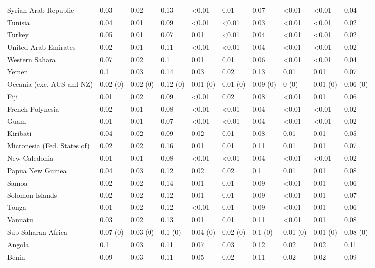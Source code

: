 \begin{longtable}[t]{llllllllll}
\addlinespace
Syrian Arab Republic & 0.03 & 0.02 & 0.13 & <0.01 & 0.01 & 0.07 & <0.01 & <0.01 & 0.04\\
Tunisia & 0.04 & 0.01 & 0.09 & <0.01 & <0.01 & 0.03 & <0.01 & <0.01 & 0.02\\
Turkey & 0.05 & 0.01 & 0.07 & 0.01 & <0.01 & 0.04 & <0.01 & <0.01 & 0.02\\
United Arab Emirates & 0.02 & 0.01 & 0.11 & <0.01 & <0.01 & 0.04 & <0.01 & <0.01 & 0.02\\
Western Sahara & 0.07 & 0.02 & 0.1 & 0.01 & 0.01 & 0.06 & <0.01 & <0.01 & 0.04\\
\addlinespace
Yemen & 0.1 & 0.03 & 0.14 & 0.03 & 0.02 & 0.13 & 0.01 & 0.01 & 0.07\\
Oceania (exc. AUS and NZ) & 0.02 (0) & 0.02 (0) & 0.12 (0) & 0.01 (0) & 0.01 (0) & 0.09 (0) & 0 (0) & 0.01 (0) & 0.06 (0)\\
Fiji & 0.01 & 0.02 & 0.09 & <0.01 & 0.02 & 0.08 & <0.01 & 0.01 & 0.06\\
French Polynesia & 0.02 & 0.01 & 0.08 & <0.01 & <0.01 & 0.04 & <0.01 & <0.01 & 0.02\\
Guam & 0.01 & 0.01 & 0.07 & <0.01 & <0.01 & 0.04 & <0.01 & <0.01 & 0.02\\
\addlinespace
Kiribati & 0.04 & 0.02 & 0.09 & 0.02 & 0.01 & 0.08 & 0.01 & 0.01 & 0.05\\
Micronesia (Fed. States of) & 0.02 & 0.02 & 0.16 & 0.01 & 0.01 & 0.11 & 0.01 & 0.01 & 0.07\\
New Caledonia & 0.01 & 0.01 & 0.08 & <0.01 & <0.01 & 0.04 & <0.01 & <0.01 & 0.02\\
Papua New Guinea & 0.04 & 0.03 & 0.12 & 0.02 & 0.02 & 0.1 & 0.01 & 0.01 & 0.08\\
Samoa & 0.02 & 0.02 & 0.14 & 0.01 & 0.01 & 0.09 & <0.01 & 0.01 & 0.06\\
\addlinespace
Solomon Islands & 0.02 & 0.02 & 0.12 & 0.01 & 0.01 & 0.09 & <0.01 & 0.01 & 0.07\\
Tonga & 0.01 & 0.02 & 0.12 & <0.01 & 0.01 & 0.09 & <0.01 & 0.01 & 0.06\\
Vanuatu & 0.03 & 0.02 & 0.13 & 0.01 & 0.01 & 0.11 & <0.01 & 0.01 & 0.08\\
Sub-Saharan Africa & 0.07 (0) & 0.03 (0) & 0.1 (0) & 0.04 (0) & 0.02 (0) & 0.1 (0) & 0.01 (0) & 0.01 (0) & 0.08 (0)\\
Angola & 0.1 & 0.03 & 0.11 & 0.07 & 0.03 & 0.12 & 0.02 & 0.02 & 0.11\\
\addlinespace
Benin & 0.09 & 0.03 & 0.11 & 0.05 & 0.02 & 0.11 & 0.02 & 0.02 & 0.09\\

\end{longtable}
